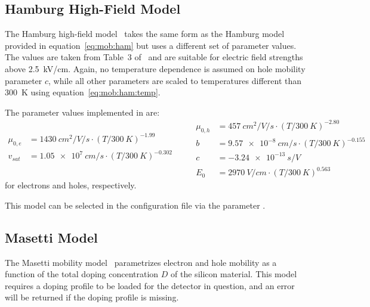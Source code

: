 \subsection{Hamburg High-Field Model}

The Hamburg high-field model~\cite{hamburg} takes the same form as the Hamburg model provided in equation~\eqref{eq:mob:ham} but uses a different set of parameter values.
The values are taken from Table~3 of~\cite{hamburg} and are suitable for electric field strengths above \SI{2.5}{\kilo V/cm}.
Again, no temperature dependence is assumed on hole mobility parameter $c$, while all other parameters are scaled to temperatures different than \SI{300}{K} using equation~\eqref{eq:mob:ham:temp}.

The parameter values implemented in \apsq are:
\begin{equation*}
    \begin{split}
        \mu_{0,e} &= \SI{1430}{cm^2 \per V \per s} \cdot (T / \SI{300}{K})^{-1.99}\\
        v_{sat}   &= \SI{1.05e7}{cm \per s} \cdot (T / \SI{300}{K})^{-0.302}\\
    \end{split}
    \qquad
    \begin{split}
      \mu_{0,h} &= \SI{457}{cm^2 \per V \per s} \cdot (T / \SI{300}{K})^{-2.80}\\
        b       &= \SI{9.57e-8}{cm \per s} \cdot (T / \SI{300}{K})^{-0.155}\\
        c       &= \SI{-3.24e-13}{s \per V}\\
        E_0     &= \SI{2970}{V \per cm} \cdot (T / \SI{300}{K})^{0.563}
    \end{split}
\end{equation*}
for electrons and holes, respectively.

This model can be selected in the configuration file via the parameter .

\subsection{Masetti Model}
\label{sec:mob:mas}

The Masetti mobility model~\cite{masetti} parametrizes electron and hole mobility as a function of the total doping concentration $D$ of the silicon material.
This model requires a doping profile to be loaded for the detector in question, and an error will be returned if the doping profile is missing.

